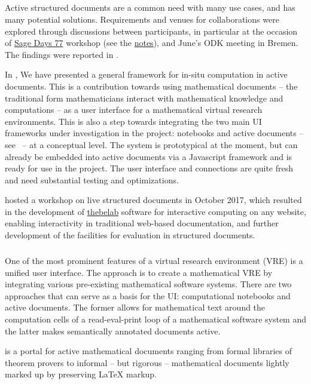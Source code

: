 \subparagraph{}

Active structured documents are a common need with many use cases, and has many potential solutions.
Requirements and venues for collaborations were explored through discussions between participants,
in particular at the occasion of \href{https://wiki.sagemath.org/days77/}{Sage Days 77} workshop
(see the \href{https://wiki.sagemath.org/days77/live-structured-documents}{notes}), and June's ODK
meeting in Bremen. The findings were reported in .

In , We have presented a general framework for in-situ computation in active documents. This is
a contribution towards using mathematical documents -- the traditional form mathematicians
interact with mathematical knowledge and computations -- as a user interface for a
mathematical virtual research environments. This is also a step towards integrating the
two main UI frameworks under investigation in the \ODK project: \Jupyter notebooks and
active documents -- see~ -- at a conceptual level. The system is
prototypical at the moment, but can already be embedded into active documents via a
Javascript framework and is ready for use in the \ODK project. The user interface and \SCSCP
connections are quite fresh and need substantial testing and optimizations.

\ODK hosted a workshop on live structured documents in October 2017,
which resulted in the development of \href{https://github.com/minrk/thebelab}{thebelab} software for interactive computing on any website,
enabling interactivity in traditional web-based documentation,
and further development of the \MathHub facilities for evaluation in structured documents.

\subparagraph{}

One of the most prominent features of a virtual research environment (VRE) is a unified user interface. The \ODK approach is to create a mathematical VRE by integrating various pre-existing mathematical software systems. There are two approaches that can serve as a basis for the \ODK UI: computational notebooks and active documents. The former allows for mathematical text around the computation cells of a read-eval-print loop of a mathematical software system and the latter makes semantically annotated documents active.

\MathHub is a portal for active mathematical documents ranging from formal libraries of theorem provers to informal – but rigorous – mathematical documents lightly marked up by preserving LaTeX markup.

